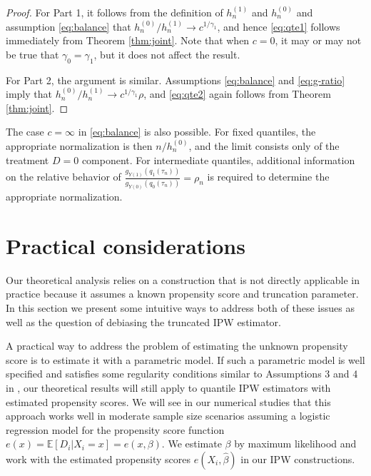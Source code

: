 \documentclass[12pt]{amsart}
\newcommand{\1}{\mathbbm{1}}
\newcommand{\0}{\mathbf{0}}
\theoremstyle{plain}
\theoremstyle{definition}
\begin{document}
\begin{proof} For Part 1, it follows from the definition of $h_n^{(1)}$ and $h_n^{(0)}$ and assumption \eqref{eq:balance} that $h_n^{(0)}/h_n^{(1)}\to c^{1/\gamma_1}$, and hence  \eqref{eq:qte1} follows immediately from Theorem \ref{thm:joint}. Note that when $c=0$, it may or may not be true that $\gamma_0=\gamma_1$, but it does not affect the result. 

For Part 2, the argument is similar.  Assumptions \eqref{eq:balance} and \eqref{eq:g-ratio} imply that $h_n^{(0)}/h_n^{(1)}\to c^{1/\gamma_1}\rho$, and \eqref{eq:qte2} again follows from Theorem \ref{thm:joint}. 
\end{proof}

    The case $c=\infty$ in \eqref{eq:balance} is also possible.
    For fixed quantiles, the appropriate normalization is then $n/h_n^{(0)}$, and the limit consists only of the treatment $D=0$ component. For intermediate quantiles, additional information on the relative behavior of  $\frac{g_{Y(1)}(q_1(\tau_n))}{g_{Y(0)}(q_0(\tau_n))}=\rho_n $ is required to determine the appropriate normalization.

\section{Practical considerations}

Our theoretical analysis relies on a construction that is not directly applicable in practice because it assumes a known propensity score and truncation parameter. In this section we present some intuitive ways to address both of  these issues as well as the question of debiasing the truncated IPW estimator. 


A practical way to address the problem of estimating the unknown propensity score is to estimate it with a parametric model. If such a parametric model is well specified and satisfies some regularity conditions similar to Assumptions 3 and 4 in \cite{ma:wang2020}, our theoretical results will still apply to quantile IPW estimators with estimated propensity scores. We will see in our numerical studies that this approach works well in moderate sample size scenarios assuming a logistic regression model for the propensity score function $e(x)=\mathbb{E}[D_i|X_i=x]=e(x, \beta)$. We estimate $\beta$ by maximum likelihood and work with the estimated propensity scores $e(X_i, \hat\beta)$
in our IPW constructions.
\end{document}

